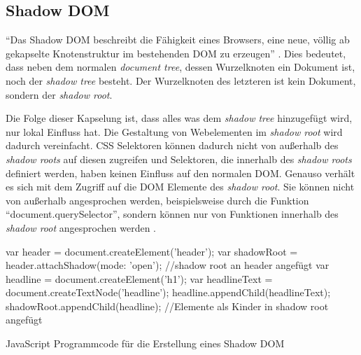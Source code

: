 \documentclass[12pt, paper=a4, bibtotoc, toc=listof, headsepline=true, numbers=endperiod]{scrreprt}
\begin{document}
		\subsection{Shadow DOM}
		\label{sec:shaDowWebCom}
		\enquote{Das Shadow DOM beschreibt die Fähigkeit eines Browsers, eine neue, völlig ab gekapselte Knotenstruktur im bestehenden \ac{DOM} zu erzeugen} \cite[Kap. 11.1.4]{gasston2014moderne}. Dies bedeutet, dass neben dem normalen \emph{document tree}, dessen Wurzelknoten ein Dokument ist, noch der \emph{shadow tree} besteht. Der Wurzelknoten des letzteren ist kein Dokument, sondern der \emph{shadow root}.

		Die Folge dieser Kapselung ist, dass alles was dem \emph{shadow tree} hinzugefügt wird, nur lokal Einfluss hat. Die Gestaltung von Webelementen im \emph{shadow root} wird dadurch vereinfacht.
		\ac{CSS} Selektoren können dadurch nicht von außerhalb des \emph{shadow roots} auf diesen zugreifen und Selektoren, die innerhalb des \emph{shadow roots} definiert werden, haben keinen Einfluss auf den normalen \ac{DOM}. Genauso verhält es sich mit dem Zugriff auf die \ac{DOM} Elemente des \emph{shadow root}. Sie können nicht von außerhalb angesprochen werden, beispielsweise durch die Funktion \enquote{document.querySelector}, sondern können nur von Funktionen innerhalb des \emph{shadow root} angesprochen werden \cite{Bidelman2016}.
		\begin{listing}
			\begin{JavaScriptcode*}{}
var header = document.createElement('header'); 
var shadowRoot = header.attachShadow({mode: 'open'}); //shadow root an header angefügt
var headline = document.createElement('h1'); 
var headlineText = document.createTextNode('headline');
headline.appendChild(headlineText);
shadowRoot.appendChild(headline); //Elemente als Kinder in shadow root angefügt
			\end{JavaScriptcode*}
				\caption[Erstellung eines Shadow DOM]{JavaScript Programmcode für die Erstellung eines Shadow DOM}
				\label{lst:javShaDom}
		\end{listing}\noindent
\end{document}
